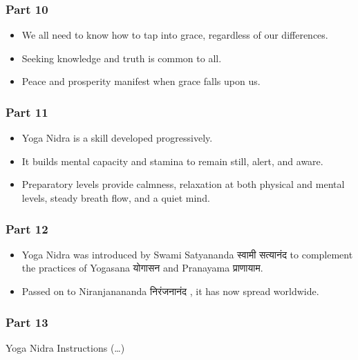 \begin{frame}[fragile]\frametitle{Part 10}

\begin{itemize}
    \item We all need to know how to tap into grace, regardless of our differences.
    \item Seeking knowledge and truth is common to all.
    \item Peace and prosperity manifest when grace falls upon us.
\end{itemize}

\end{frame}

\begin{frame}[fragile]\frametitle{Part 11}

\begin{itemize}
    \item Yoga Nidra is a skill developed progressively.
    \item It builds mental capacity and stamina to remain still, alert, and aware.
    \item Preparatory levels provide calmness, relaxation at both physical and mental levels, steady breath flow, and a quiet mind.
\end{itemize}

\end{frame}

\begin{frame}[fragile]\frametitle{Part 12}

\begin{itemize}
    \item Yoga Nidra was introduced by Swami Satyananda स्वामी सत्यानंद  to complement the practices of Yogasana योगासन and Pranayama प्राणायाम.
    \item Passed on to Niranjanananda निरंजनानंद , it has now spread worldwide.
\end{itemize}

\end{frame}

\begin{frame}[fragile]\frametitle{Part 13}

Yoga Nidra Instructions (\ldots)

\end{frame}

